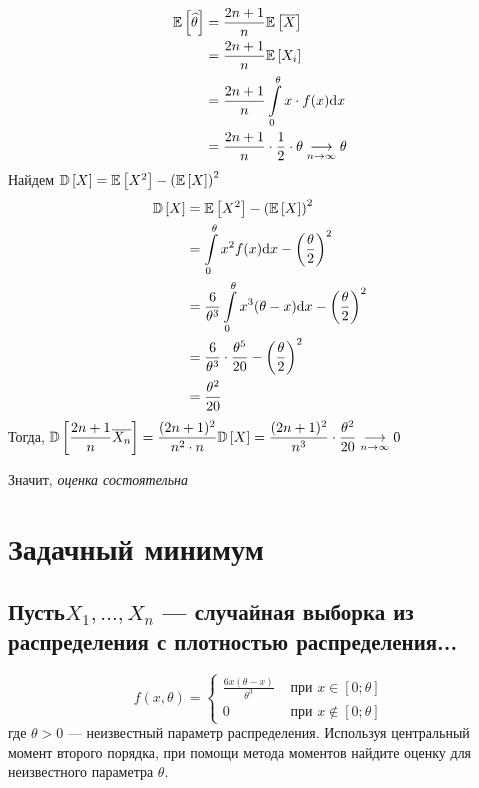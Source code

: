 \documentclass{article}
\begin{document}
\begin{equation*}
    \begin{aligned}
        \mathbb{E}\left[\widehat{\theta}\right]&=\frac{2n+1}{n}\mathbb{E}\left[\overline{X}\right]\\
        &=\frac{2n+1}{n}\mathbb{E}\left[X_i\right]\\
        &=\frac{2n+1}{n}\int\limits_0^{\theta}x\cdot f(x)\text{d}x\\
        &=\frac{2n+1}{n}\cdot\frac{1}{2}\cdot\theta\underset{n\to\infty}{\longrightarrow}\theta
    \end{aligned}
\end{equation*}
Найдем $\mathbb{D}\left[X\right]=\mathbb{E}\left[X^2\right]-\left(\mathbb{E}\left[X\right]\right)^2$
\begin{equation*}
    \begin{aligned}
        \mathbb{D}\left[X\right]&=\mathbb{E}\left[X^2\right]-\left(\mathbb{E}\left[X\right]\right)^2\\
        &=\int\limits_{0}^{\theta}x^2f(x)\text{d}x-\left(\frac{\theta}{2}\right)^2\\
        &=\frac{6}{\theta^3}\int\limits_{0}^{\theta}x^3(\theta-x)\text{d}x-\left(\frac{\theta}{2}\right)^2\\
        &=\frac{6}{\theta^3}\cdot\frac{\theta^5}{20}-\left(\frac{\theta}{2}\right)^2\\
        &=\frac{\theta^2}{20}
    \end{aligned}
\end{equation*}
Тогда, $\mathbb{D}\left[\displaystyle\frac{2n+1}{n}\overline{X_n}\right]=\displaystyle\frac{(2n+1)^2}{n^2\cdot n}\mathbb{D}\left[X\right]=\displaystyle\frac{(2n+1)^2}{n^3}\cdot\frac{\theta^2}{20}\underset{n\to\infty}{\longrightarrow}0$

Значит, \textit{оценка состоятельна}

\section{Задачный минимум}
\subsection{Пусть$ X_1, \ldots, X_n$ — случайная выборка из распределения с плотностью распределения...}
\begin{equation*}
    f(x, \theta)= \begin{cases}\frac{6 x(\theta-x)}{\theta^{3}} & \text { при } x \in[0 ; \theta] \\ 0 & \text { при } x \notin[0 ; \theta]\end{cases}
\end{equation*}
где $\theta>0$ — неизвестный параметр распределения. Используя центральный момент второго порядка, при помощи метода моментов найдите оценку для неизвестного параметра $\theta$.
\end{document}
